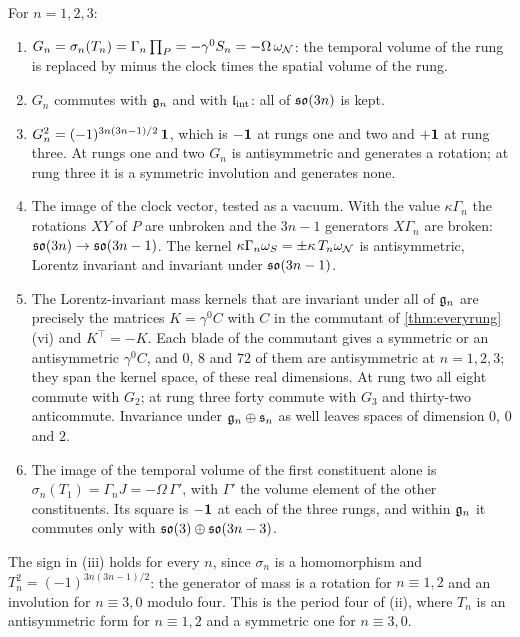 \begin{theorem}
\label{thm:massrung}
For $n=1,2,3$:
\begin{enumerate}[label=(\roman*),leftmargin=2.2em,itemsep=1pt]
\item $G_n=\sigma_n(T_n)=\Gamma_n\prod_P=-\gamma^0S_n=-\Omega\,\omega_\mathcal N$: the temporal volume of the rung is replaced by minus the clock
times the spatial volume of the rung.
\item $G_n$ commutes with $\mathfrak g_n$ and with $\mathfrak l_{\rm int}$: all of $\mathfrak{so}(3n)$ is kept.
\item $G_n^2=(-1)^{3n(3n-1)/2}\,\mathbf 1$, which is $-\mathbf 1$ at rungs one and two and $+\mathbf 1$ at rung three. At rungs one and two $G_n$ is
antisymmetric and generates a rotation; at rung three it is a symmetric involution and generates none.
\item The image of the clock vector, tested as a vacuum. With the value $\kappa\Gamma_n$ the rotations $XY$ of $P$ are unbroken and the $3n-1$
generators $X\Gamma_n$ are broken: $\mathfrak{so}(3n)\to\mathfrak{so}(3n-1)$. The kernel $\kappa\Gamma_n\omega_S=\pm\kappa\,T_n\omega_\mathcal N$ is antisymmetric,
Lorentz invariant and invariant under $\mathfrak{so}(3n-1)$.
\item The Lorentz-invariant mass kernels that are invariant under all of $\mathfrak g_n$ are precisely the matrices $K=\gamma^0C$ with $C$ in the
commutant of \cref{thm:everyrung}(vi) and $K^\top=-K$. Each blade of the commutant gives a symmetric or an antisymmetric $\gamma^0C$, and
$0$, $8$ and $72$ of them are antisymmetric at $n=1,2,3$; they span the kernel space, of these real dimensions. At rung two all eight commute
with $G_2$; at rung three forty commute with $G_3$ and thirty-two anticommute. Invariance under $\mathfrak g_n\oplus\mathfrak s_n$ as well leaves
spaces of dimension $0$, $0$ and $2$.
\item The image of the temporal volume of the first constituent alone is $\sigma_n(T_1)=\Gamma_nJ=-\Omega\,\Gamma'$, with $\Gamma'$ the
volume element of the other constituents. Its square is $-\mathbf 1$ at each of the three rungs, and within $\mathfrak g_n$ it commutes only with $\mathfrak{so}(3)\oplus\mathfrak{so}(3n-3)$.
\end{enumerate}
\end{theorem}

The sign in (iii) holds for every $n$, since $\sigma_n$ is a homomorphism and $T_n^2=(-1)^{3n(3n-1)/2}$: the generator of mass is a rotation
for $n\equiv1,2$ and an involution for $n\equiv3,0$ modulo four. This is the period four of (ii), where $T_n$ is an
antisymmetric form for $n\equiv1,2$ and a symmetric one for $n\equiv3,0$.

